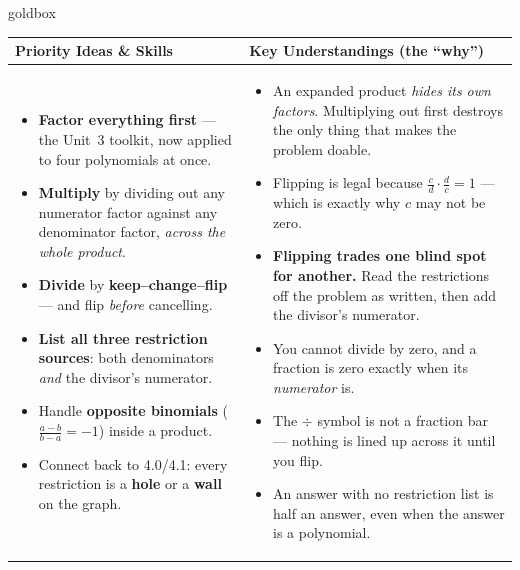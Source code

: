 \documentclass[10pt]{article}
\begin{document}
\renewcommand{\arraystretch}{1.4}
\begin{skillbox}{goldbox}
\begin{tabularx}{\linewidth}{@{}X|X@{}}
\textbf{Priority Ideas \& Skills} & \textbf{Key Understandings (the ``why'')} \\[2pt]
\hline
\vspace{-6pt}
\begin{itemize}[leftmargin=1.1em, nosep, after=\vspace{2pt}]
  \item \textbf{Factor everything first} --- the Unit~3 toolkit, now applied to four polynomials at once.
  \item \textbf{Multiply} by dividing out any numerator factor against any denominator factor, \emph{across the whole product}.
  \item \textbf{Divide} by \textbf{keep--change--flip} --- and flip \emph{before} cancelling.
  \item \textbf{List all three restriction sources}: both denominators \emph{and} the divisor's numerator.
  \item Handle \textbf{opposite binomials} ($\frac{a-b}{b-a}=-1$) inside a product.
  \item Connect back to 4.0/4.1: every restriction is a \textbf{hole} or a \textbf{wall} on the graph.
\end{itemize}
&
\vspace{-6pt}
\begin{itemize}[leftmargin=1.1em, nosep, after=\vspace{2pt}]
  \item An expanded product \emph{hides its own factors}. Multiplying out first destroys the only thing that makes the problem doable.
  \item Flipping is legal because $\frac cd\cdot\frac dc=1$ --- which is exactly why $c$ may not be zero.
  \item \textbf{Flipping trades one blind spot for another.} Read the restrictions off the problem as written, then add the divisor's numerator.
  \item You cannot divide by zero, and a fraction is zero exactly when its \emph{numerator} is.
  \item The $\div$ symbol is not a fraction bar --- nothing is lined up across it until you flip.
  \item An answer with no restriction list is half an answer, even when the answer is a polynomial.
\end{itemize}
\end{tabularx}
\end{skillbox}
\end{document}
